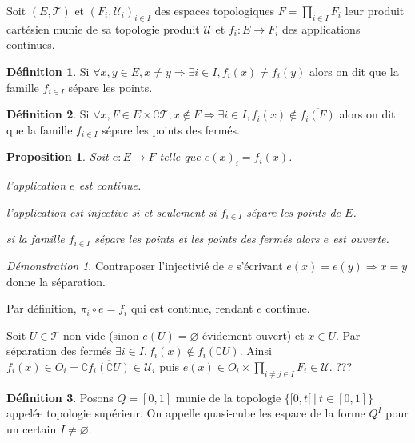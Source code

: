 \documentclass[a4paper, 11pt, french]{book}
\newenvironment{itemise}{\itemize}{\enditemize}
\theoremstyle{plain} %
\newtheorem{proposition}{Proposition}
\theoremstyle{definition} %
\newtheorem{definition}{Définition}
\theoremstyle{remark} %
\newtheorem*{demonstration}{Démonstration}
\newcommand{\1}{\mathds{1}}
\newcommand\vide{\varnothing}
\newcommand{\scr}[1]{\mathscr{#1}}
\newcommand\ens[2]{\{#1 \ |\ #2\}}
\begin{document}
Soit $(E, \scr{T})$ et $(F_i, \scr{U}_i)_{i\in I}$ des espaces topologiques $F=\prod_{i\in I}F_i$ leur produit cartésien munie de sa topologie produit $\scr{U}$ et $f_i:E\rightarrow F_i$ des applications continues.

\begin{definition}
	Si $\forall x, y\in E, x\neq y\Rightarrow\exists i\in I, f_i(x)\neq f_i(y)$ alors on dit que la famille $f_{i\in I}$ sépare les points.
\end{definition}

\begin{definition}
	Si $\forall x, F\in E\times\complement\scr{T}, x\notin F\Rightarrow\exists i\in I, f_i(x)\notin\overline{f_i(F)}$ alors on dit que la famille $f_{i\in I}$ sépare les points des fermés.
\end{definition}

\begin{proposition}
	Soit $e:E\rightarrow F$ telle que $e(x)_i=f_i(x)$.
	\begin{itemise}
		\item l'application $e$ est continue.
		\item l'application est injective si et seulement si $f_{i\in I}$ sépare les points de $E$.
		\item si la famille $f_{i\in I}$ sépare les points et les points des fermés alors $e$ est ouverte.
	\end{itemise}
\end{proposition}

\begin{demonstration}
	\begin{itemise}
		\item Contraposer l'injectivié de $e$ s'écrivant $e(x)=e(y)\Rightarrow x=y$ donne la séparation.
		\item Par définition, $\pi_i\circ e=f_i$  qui est continue, rendant $e$ continue.
		\item Soit $U\in\scr{T}$ non vide (sinon $e(U)=\vide$ évidement ouvert) et $x\in U$.
		Par séparation des fermés $\exists i\in I, f_i(x)\notin\overline{f_i(\complement U)}$.
		Ainsi $f_i(x)\in O_i=\complement\overline{f_i(\complement U)}\in\scr{U}_i$ puis $e(x)\in O_i\times\prod_{i\neq j\in I}F_i\in\scr{U}$.
		{\color{red} ???}
	\end{itemise}
\end{demonstration}

\begin{definition}
	Posons $Q=[0, 1]$ munie de la topologie $\ens{[0, t[}{t\in[0, 1]}$ appelée topologie supérieur.
	On appelle quasi-cube les espace de la forme $Q^I$ pour un certain $I\neq\vide$.
\end{definition}
\end{document}
